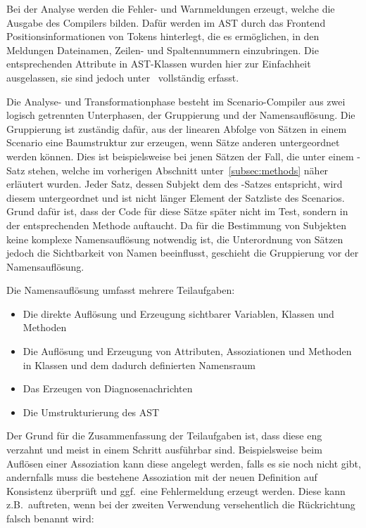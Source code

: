 Bei der Analyse werden die Fehler- und Warnmeldungen erzeugt, welche die Ausgabe des Compilers bilden.
Dafür werden im AST durch das Frontend Positionsinformationen von Tokens hinterlegt, die es ermöglichen, in den Meldungen Dateinamen, Zeilen- und Spaltennummern einzubringen.
Die entsprechenden Attribute in AST-Klassen wurden hier zur Einfachheit ausgelassen, sie sind jedoch unter~\cite{gts-definitions} vollständig erfasst.

Die Analyse- und Transformationphase besteht im Scenario-Compiler aus zwei logisch getrennten Unterphasen, der Gruppierung und der Namensauflösung.
Die Gruppierung ist zuständig dafür, aus der linearen Abfolge von Sätzen in einem Scenario eine Baumstruktur zur erzeugen, wenn Sätze anderen untergeordnet werden können.
Dies ist beispielsweise bei jenen Sätzen der Fall, die unter einem -Satz stehen, welche im vorherigen Abschnitt unter~\ref{subsec:methods} näher erläutert wurden.
Jeder Satz, dessen Subjekt dem des -Satzes entspricht, wird diesem untergeordnet und ist nicht länger Element der Satzliste des Scenarios.
Grund dafür ist, dass der Code für diese Sätze später nicht im Test, sondern in der entsprechenden Methode auftaucht.
Da für die Bestimmung von Subjekten keine komplexe Namensauflösung notwendig ist, die Unterordnung von Sätzen jedoch die Sichtbarkeit von Namen beeinflusst, geschieht die Gruppierung vor der Namensauflösung.

Die Namensauflösung umfasst mehrere Teilaufgaben:

\begin{itemize}
    \item Die direkte Auflösung und Erzeugung sichtbarer Variablen, Klassen und Methoden
    \item Die Auflösung und Erzeugung von Attributen, Assoziationen und Methoden in Klassen und dem dadurch definierten Namensraum
    \item Das Erzeugen von Diagnosenachrichten
    \item Die Umstrukturierung des AST
\end{itemize}

Der Grund für die Zusammenfassung der Teilaufgaben ist, dass diese eng verzahnt und meist in einem Schritt ausführbar sind.
Beispielsweise beim Auflösen einer Assoziation kann diese angelegt werden, falls es sie noch nicht gibt, andernfalls muss die bestehene Assoziation mit der neuen Definition auf Konsistenz überprüft und ggf.\ eine Fehlermeldung erzeugt werden.
Diese kann z.B.\ auftreten, wenn bei der zweiten Verwendung versehentlich die Rückrichtung falsch benannt wird:

